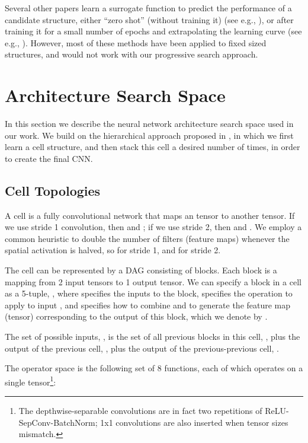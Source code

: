 \documentclass[runningheads]{llncs}
\begin{document}
Several other papers learn a surrogate function to predict the performance of a candidate structure, either ``zero shot'' (without training it)
(see e.g., \cite{SMASH}),
or after training it for a small number of epochs and extrapolating the learning curve
(see e.g.,  \cite{Domhan2015,Baker2017acc}).
However, most of these methods have been applied to fixed sized structures, and would not work with our progressive search approach.
 
\section{Architecture Search Space}
\label{sec:search}
\label{sec:space}


In this section we describe the neural network architecture search space used in our work.
We build on the hierarchical approach
proposed in  \cite{DBLP:journals/corr/ZophVSL17},
in which we first learn a cell structure, and then stack this cell a desired number of times,
in order to create the final CNN.

\subsection{Cell Topologies}

A cell is a fully convolutional network
that maps an  tensor
to another  tensor.
If we use stride 1 convolution, then  and ;
if we use stride 2, then  and .
We employ a common heuristic to double the number of filters (feature maps)
whenever the spatial activation is halved,
so  for stride 1, and  for stride 2.

The cell can be represented 
by a DAG consisting of  blocks. Each block is a mapping from 2 input
tensors to 1 output tensor.
We can specify a block  in a cell  as a 5-tuple,
,
where
 specifies the 
inputs to the block,
 specifies the operation to apply to input ,
and  specifies how to combine  and  to generate the feature map (tensor) corresponding to  the output of this block,
which we denote by .

The set of possible inputs,
 , is the
set of all previous blocks in this cell,
,
plus the output of the previous cell,
,
plus the output of the previous-previous cell,
.


The operator space  
is the following set of 8 functions, each of which
operates on a single tensor\footnote{The depthwise-separable convolutions are in fact two repetitions of ReLU-SepConv-BatchNorm; 1x1 convolutions are also inserted when tensor sizes mismatch.}:
\end{document}
